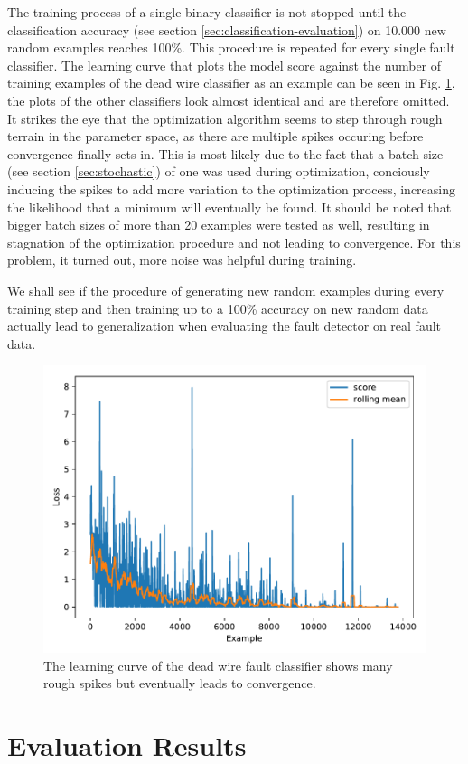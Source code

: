 The training process of a single binary classifier is not stopped
until the classification accuracy (see section
\ref{sec:classification-evaluation}) on 10.000 new random examples
reaches 100\%. This procedure is repeated for every single fault
classifier. The learning curve that plots the model score against the
number of training examples of the dead wire classifier as an example
can be seen in Fig. \ref{fig:learning-curve}, the plots of the other
classifiers look almost identical and are therefore omitted. It
strikes the eye that the optimization algorithm seems to step through
rough terrain in the parameter space, as there are multiple spikes
occuring before convergence finally sets in. This is most likely due
to the fact that a batch size (see section \ref{sec:stochastic}) of
one was used during optimization, conciously inducing the spikes to
add more variation to the optimization process, increasing
the likelihood that a minimum will eventually be found. It should be
noted that bigger batch sizes of more than 20 examples were tested as
well, resulting in stagnation of the optimization procedure and not
leading to convergence. For this problem, it turned out, more noise
was helpful during training.

We shall see if the procedure of generating new random examples during every
training step and then training up to a 100\% accuracy on new random
data actually lead to generalization when evaluating the fault
detector on real fault data.

\begin{figure}[h]
  \centering
  \includegraphics[width=.8\textwidth]{../figures/score_test}
  \caption{The learning curve of the dead wire fault classifier
    shows many rough spikes but eventually leads to convergence.}
  \label{fig:learning-curve}
\end{figure}

\section{Evaluation Results}

